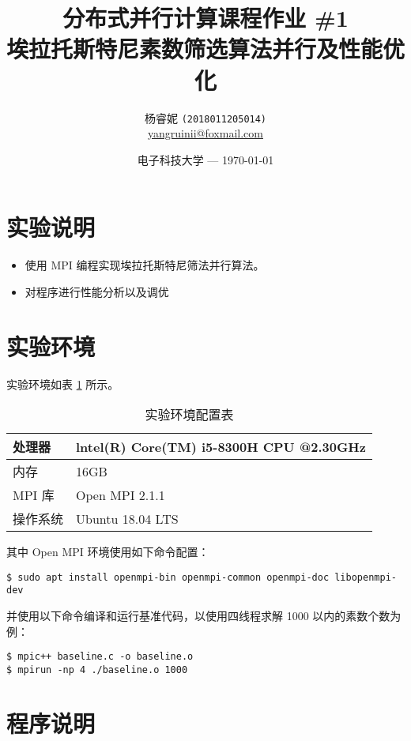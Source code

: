 \documentclass[11pt]{article}
\title{\Large 分布式并行计算课程作业 \#1 \\
  \LARGE 埃拉托斯特尼素数筛选算法并行及性能优化} %
\author{杨睿妮 \texttt{(2018011205014)} \\ \url{yangruinii@foxmail.com}} %
\date{电子科技大学 --- \today} %
\begin{document}
  
  \maketitle %

  \section{实验说明}
  \begin{itemize}
    \item 使用 MPI 编程实现埃拉托斯特尼筛法并行算法。
    \item 对程序进行性能分析以及调优
  \end{itemize}

  \section{实验环境}
  实验环境如表 \ref{tab:env} 所示。
  \begin{table}[htbp]
    \centering
    \caption{实验环境配置表}
    \label{tab:env}
    \begin{tabular}{ll}
      \hline
      处理器 & lntel(R) Core(TM) i5-8300H CPU @2.30GHz \\
      \hline
      内存 & 16GB \\
      \hline
      MPI 库 & Open MPI 2.1.1\\
      \hline
      操作系统 & Ubuntu 18.04 LTS \\
      \hline
    \end{tabular}
  \end{table}
  
  其中 Open MPI 环境使用如下命令配置：
  \begin{commandline}
    \begin{verbatim}
$ sudo apt install openmpi-bin openmpi-common openmpi-doc libopenmpi-dev
    \end{verbatim}
\end{commandline}

并使用以下命令编译和运行基准代码，以使用四线程求解 1000 以内的素数个数为例：
\begin{commandline}
  \begin{verbatim}
$ mpic++ baseline.c -o baseline.o
$ mpirun -np 4 ./baseline.o 1000
  \end{verbatim}
\end{commandline}

  \section{程序说明}
\end{document}
